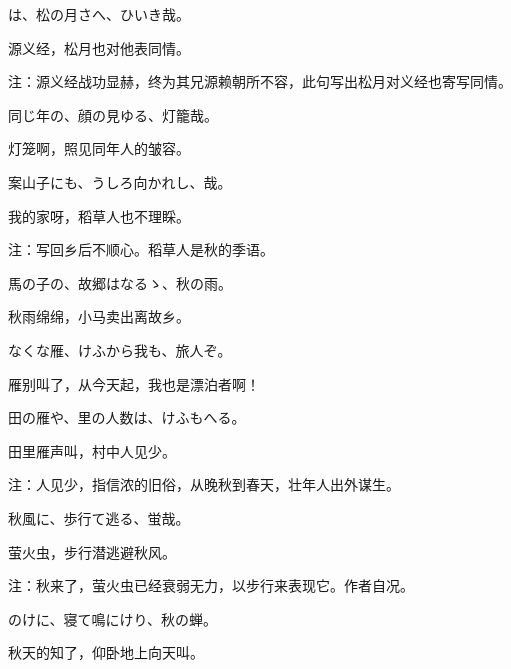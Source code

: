 \begin{haiku}
    {\FH {}は、松の月さへ、ひいき哉。}

    {\FK 源义经，松月也对他表同情。}

    {\FT 注：源义经战功显赫，终为其兄源赖朝所不容，此句写出松月对义经也寄写同情。}
\end{haiku}

\begin{haiku}
    {\FH 同じ年の、顔の見ゆる、灯籠哉。}

    {\FK 灯笼啊，照见同年人的皱容。}
\end{haiku}

\begin{haiku}
    {\FH 案山子にも、うしろ向かれし、哉。}

    {\FK 我的家呀，稻草人也不理睬。}

    {\FT 注：写回乡后不顺心。稻草人是秋的季语。}
\end{haiku}

\begin{haiku}
    {\FH 馬の子の、故郷はなるゝ、秋の雨。}

    {\FK 秋雨绵绵，小马卖出离故乡。}
\end{haiku}

\begin{haiku}
    {\FH なくな雁、けふから我も、旅人ぞ。}

    {\FK 雁别叫了，从今天起，我也是漂泊者啊！}
\end{haiku}

\begin{haiku}
    {\FH 田の雁や、里の人数は、けふもへる。}

    {\FK 田里雁声叫，村中人见少。}

    {\FT 注：人见少，指信浓的旧俗，从晚秋到春天，壮年人出外谋生。}
\end{haiku}

\begin{haiku}
    {\FH 秋風に、歩行て逃る、蛍哉。}

    {\FK 萤火虫，步行潜逃避秋风。}

    {\FT 注：秋来了，萤火虫已经衰弱无力，以步行来表现它。作者自况。}
\end{haiku}

\begin{haiku}
    {\FH {}のけに、寝て鳴にけり、秋の蝉。}

    {\FK 秋天的知了，仰卧地上向天叫。}
\end{haiku}

